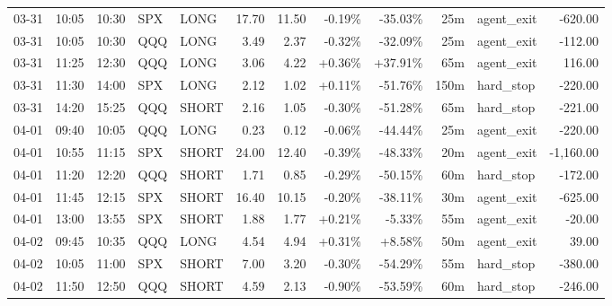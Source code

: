 \documentclass[11pt,a4paper,twoside]{article}
\begin{document}
\begin{center}
\begin{longtable}{>{\color{txtmain}}l l l l l r r r r r >{\color{txtmain}}l r}
03-31 & 10:05 & 10:30 & SPX & LONG & 17.70 & 11.50 & \textcolor{lossred}{-0.19\%} & \textcolor{lossred}{-35.03\%} & 25m & agent\_exit & \textcolor{lossred}{-620.00} \\
03-31 & 10:05 & 10:30 & QQQ & LONG & 3.49 & 2.37 & \textcolor{lossred}{-0.32\%} & \textcolor{lossred}{-32.09\%} & 25m & agent\_exit & \textcolor{lossred}{-112.00} \\
03-31 & 11:25 & 12:30 & QQQ & LONG & 3.06 & 4.22 & \textcolor{wingreen}{+0.36\%} & \textcolor{wingreen}{+37.91\%} & 65m & agent\_exit & \textcolor{wingreen}{116.00} \\
03-31 & 11:30 & 14:00 & SPX & LONG & 2.12 & 1.02 & \textcolor{wingreen}{+0.11\%} & \textcolor{lossred}{-51.76\%} & 150m & hard\_stop & \textcolor{lossred}{-220.00} \\
03-31 & 14:20 & 15:25 & QQQ & SHORT & 2.16 & 1.05 & \textcolor{lossred}{-0.30\%} & \textcolor{lossred}{-51.28\%} & 65m & hard\_stop & \textcolor{lossred}{-221.00} \\
04-01 & 09:40 & 10:05 & QQQ & LONG & 0.23 & 0.12 & \textcolor{lossred}{-0.06\%} & \textcolor{lossred}{-44.44\%} & 25m & agent\_exit & \textcolor{lossred}{-220.00} \\
04-01 & 10:55 & 11:15 & SPX & SHORT & 24.00 & 12.40 & \textcolor{lossred}{-0.39\%} & \textcolor{lossred}{-48.33\%} & 20m & agent\_exit & \textcolor{lossred}{-1,160.00} \\
04-01 & 11:20 & 12:20 & QQQ & SHORT & 1.71 & 0.85 & \textcolor{lossred}{-0.29\%} & \textcolor{lossred}{-50.15\%} & 60m & hard\_stop & \textcolor{lossred}{-172.00} \\
04-01 & 11:45 & 12:15 & SPX & SHORT & 16.40 & 10.15 & \textcolor{lossred}{-0.20\%} & \textcolor{lossred}{-38.11\%} & 30m & agent\_exit & \textcolor{lossred}{-625.00} \\
04-01 & 13:00 & 13:55 & SPX & SHORT & 1.88 & 1.77 & \textcolor{wingreen}{+0.21\%} & \textcolor{lossred}{-5.33\%} & 55m & agent\_exit & \textcolor{lossred}{-20.00} \\
04-02 & 09:45 & 10:35 & QQQ & LONG & 4.54 & 4.94 & \textcolor{wingreen}{+0.31\%} & \textcolor{wingreen}{+8.58\%} & 50m & agent\_exit & \textcolor{wingreen}{39.00} \\
04-02 & 10:05 & 11:00 & SPX & SHORT & 7.00 & 3.20 & \textcolor{lossred}{-0.30\%} & \textcolor{lossred}{-54.29\%} & 55m & hard\_stop & \textcolor{lossred}{-380.00} \\
04-02 & 11:50 & 12:50 & QQQ & SHORT & 4.59 & 2.13 & \textcolor{lossred}{-0.90\%} & \textcolor{lossred}{-53.59\%} & 60m & hard\_stop & \textcolor{lossred}{-246.00} \\

\end{longtable}
\end{center}
\end{document}
